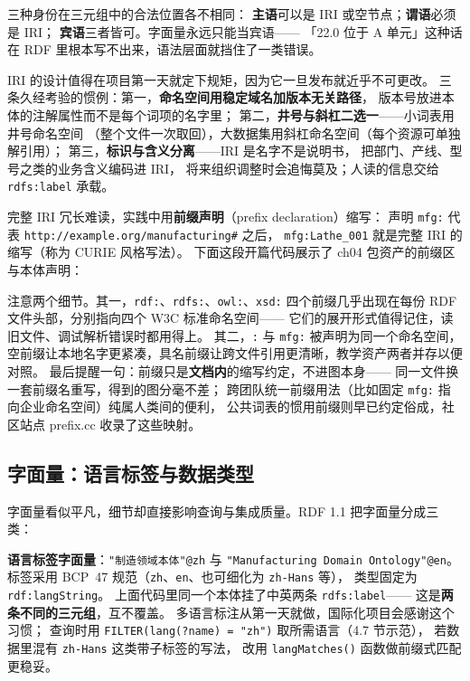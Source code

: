 三种身份在三元组中的合法位置各不相同：
\textbf{主语}可以是 IRI 或空节点；\textbf{谓语}必须是 IRI；
\textbf{宾语}三者皆可。字面量永远只能当宾语——
「22.0 位于 A 单元」这种话在 RDF 里根本写不出来，语法层面就挡住了一类错误。

IRI 的设计值得在项目第一天就定下规矩，因为它一旦发布就近乎不可更改。
三条久经考验的惯例：第一，\textbf{命名空间用稳定域名加版本无关路径}，
版本号放进本体的注解属性而不是每个词项的名字里；
第二，\textbf{井号与斜杠二选一}——小词表用井号命名空间
（整个文件一次取回），大数据集用斜杠命名空间（每个资源可单独解引用）；
第三，\textbf{标识与含义分离}——IRI 是名字不是说明书，
把部门、产线、型号之类的业务含义编码进 IRI，
将来组织调整时会追悔莫及；人读的信息交给 \texttt{rdfs:label} 承载。

完整 IRI 冗长难读，实践中用\textbf{前缀声明}（prefix declaration）缩写：
声明 \texttt{mfg:} 代表 \nolinkurl{http://example.org/manufacturing#} 之后，
\texttt{mfg:Lathe\_001} 就是完整 IRI 的缩写（称为 CURIE 风格写法）。
下面这段开篇代码展示了 ch04 包资产的前缀区与本体声明：



注意两个细节。其一，\texttt{rdf:}、\texttt{rdfs:}、\texttt{owl:}、\texttt{xsd:}
四个前缀几乎出现在每份 RDF 文件头部，分别指向四个 W3C 标准命名空间——
它们的展开形式值得记住，读旧文件、调试解析错误时都用得上。
其二，\texttt{:} 与 \texttt{mfg:} 被声明为同一个命名空间，
空前缀让本地名字更紧凑，具名前缀让跨文件引用更清晰，教学资产两者并存以便对照。
最后提醒一句：前缀只是\textbf{文档内}的缩写约定，不进图本身——
同一文件换一套前缀名重写，得到的图分毫不差；
跨团队统一前缀用法（比如固定 \texttt{mfg:} 指向企业命名空间）纯属人类间的便利，
公共词表的惯用前缀则早已约定俗成，社区站点 prefix.cc 收录了这些映射。

\subsection{字面量：语言标签与数据类型}

字面量看似平凡，细节却直接影响查询与集成质量。RDF 1.1 把字面量分成三类：

\textbf{语言标签字面量}：\texttt{"制造领域本体"@zh} 与
\texttt{"Manufacturing Domain Ontology"@en}。
标签采用 BCP~47 规范（\texttt{zh}、\texttt{en}、也可细化为 \texttt{zh-Hans} 等），
类型固定为 \texttt{rdf:langString}。
上面代码里同一个本体挂了中英两条 \texttt{rdfs:label}——
这是\textbf{两条不同的三元组}，互不覆盖。
多语言标注从第一天就做，国际化项目会感谢这个习惯；
查询时用 \texttt{FILTER(lang(?name) = "zh")} 取所需语言（4.7 节示范），
若数据里混有 \texttt{zh-Hans} 这类带子标签的写法，
改用 \texttt{langMatches()} 函数做前缀式匹配更稳妥。

